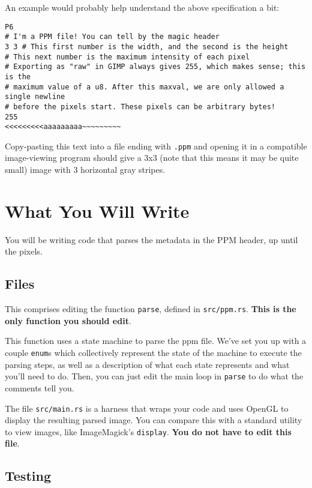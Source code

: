 \documentclass{article}
\begin{document}
An example would probably help understand the above specification a bit:

\begin{verbatim}
P6
# I'm a PPM file! You can tell by the magic header
3 3 # This first number is the width, and the second is the height
# This next number is the maximum intensity of each pixel
# Exporting as "raw" in GIMP always gives 255, which makes sense; this is the
# maximum value of a u8. After this maxval, we are only allowed a single newline
# before the pixels start. These pixels can be arbitrary bytes!
255
<<<<<<<<<aaaaaaaaa~~~~~~~~~
\end{verbatim}

Copy-pasting this text into a file ending with \texttt{.ppm} and opening it in a compatible image-viewing program should give a 3x3 (note that this means it may be quite small) image with 3 horizontal gray stripes.

\section*{What You Will Write}

You will be writing code that parses the metadata in the PPM header, up until the pixels.

\subsection*{Files}

This comprises editing the function \texttt{parse}, defined in \texttt{src/ppm.rs}. \textbf{This is the only function you should edit}.

This function uses a state machine to parse the ppm file. We've set you up with a couple \texttt{enum}s which collectively represent the state of the machine to execute the parsing steps, as well as a description of what each state represents and what you'll need to do. Then, you can just edit the main loop in \texttt{parse} to do what the comments tell you.

The file \texttt{src/main.rs} is a harness that wraps your code and uses OpenGL to display the resulting parsed image. You can compare this with a standard utility to view images, like ImageMagick's \texttt{display}.
 \textbf{You do not have to edit this file}.

\subsection*{Testing}
\end{document}
